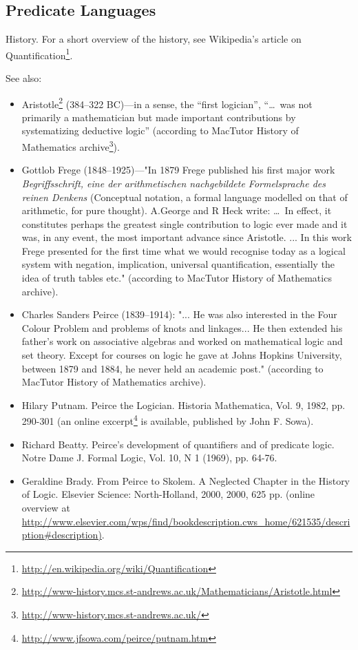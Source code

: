 \subsection{Predicate Languages}

History.
For a short overview of the history, see Wikipedia's article on Quantification\footnote{\url{http://en.wikipedia.org/wiki/Quantification}}.

See also:

\begin{itemize}
    \item Aristotle\footnote{\url{http://www-history.mcs.st-andrews.ac.uk/Mathematicians/Aristotle.html}} (384--322 BC)---in a sense, the ``first logician'', ``\ldots~was not primarily a mathematician but made important contributions by systematizing deductive logic'' (according to MacTutor History of Mathematics archive\footnote{\url{http://www-history.mcs.st-andrews.ac.uk/}}).
    \item Gottlob Frege (1848--1925)---"In 1879 Frege published his first major work \emph{Begriffsschrift, eine der arithmetischen nachgebildete Formelsprache des reinen Denkens} (Conceptual notation, a formal language modelled on that of arithmetic, for pure thought).
    A.George and R Heck write: \ldots~In effect, it constitutes perhaps the greatest single contribution to logic ever made and it was, in any event, the most important advance since Aristotle.
    ... In this work Frege presented for the first time what we would recognise today as a logical system with negation, implication, universal quantification, essentially the idea of truth tables etc." (according to MacTutor History of Mathematics archive).
\item Charles Sanders Peirce (1839--1914): "... He was also interested in the Four Colour Problem and problems of knots and linkages... He then extended his father's work on associative algebras and worked on mathematical logic and set theory. Except for courses on logic he gave at Johns Hopkins University, between 1879 and 1884, he never held an academic post." (according to MacTutor History of Mathematics archive).
\item Hilary Putnam. Peirce the Logician. Historia Mathematica, Vol. 9, 1982, pp. 290-301 (an online excerpt\footnote{\url{http://www.jfsowa.com/peirce/putnam.htm}} is available, published by John F. Sowa).
\item Richard Beatty. Peirce's development of quantifiers and of predicate logic. Notre Dame J. Formal Logic, Vol. 10, N 1 (1969), pp. 64-76.
\item Geraldine Brady. From Peirce to Skolem. A Neglected Chapter in the History of Logic. Elsevier Science: North-Holland, 2000, 2000, 625 pp. (online overview at \url{http://www.elsevier.com/wps/find/bookdescription.cws\_home/621535/description#description)}.
\end{itemize}

